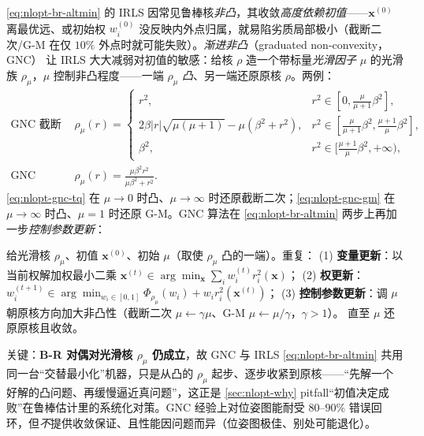 \cref{eq:nlopt-br-altmin} 的 IRLS 因常见鲁棒核\emph{非凸}，其收敛\emph{高度依赖初值}——$\mathbf{x}^{(0)}$ 离最优远、或初始权 $w_i^{(0)}$ 没反映内外点归属，就易陷劣质局部极小（截断二次/G-M 在仅 $10\%$ 外点时就可能失败\cite{carlone2026handbook}）。\emph{渐进非凸}（graduated non-convexity，GNC）\cite{yang2020gnc} 让 IRLS 大大减弱对初值的敏感：给核 $\rho$ 造一个带标量\emph{光滑因子} $\mu$ 的光滑族 $\rho_\mu$，$\mu$ 控制非凸程度——一端 $\rho_\mu$ \emph{凸}、另一端还原原核 $\rho$。两例：
\begin{align}
  \text{GNC 截断二次：}\ &\rho_\mu(r)=
  \begin{cases}
  r^2,& r^2\in[0,\tfrac{\mu}{\mu+1}\beta^2],\\
  2\beta|r|\sqrt{\mu(\mu+1)}-\mu(\beta^2+r^2),& r^2\in[\tfrac{\mu}{\mu+1}\beta^2,\tfrac{\mu+1}{\mu}\beta^2],\\
  \beta^2,& r^2\in[\tfrac{\mu+1}{\mu}\beta^2,+\infty),
  \end{cases}
  \label{eq:nlopt-gnc-tq}\\
  \text{GNC Geman--McClure：}\ &\rho_\mu(r)=\frac{\mu\beta^2 r^2}{\mu\beta^2+r^2}.
  \label{eq:nlopt-gnc-gm}
\end{align}
\cref{eq:nlopt-gnc-tq} 在 $\mu\to0$ 时凸、$\mu\to\infty$ 时还原截断二次；\cref{eq:nlopt-gnc-gm} 在 $\mu\to\infty$ 时凸、$\mu{=}1$ 时还原 G-M。GNC 算法在 \cref{eq:nlopt-br-altmin} 两步上再加一步\emph{控制参数更新}：
\begin{algo}\label{alg:nlopt-gnc}
给光滑核 $\rho_\mu$、初值 $\mathbf{x}^{(0)}$、初始 $\mu$（取使 $\rho_\mu$ 凸的一端）。重复：
(1) \textbf{变量更新}：以当前权解加权最小二乘 $\mathbf{x}^{(t)}\in\arg\min_{\mathbf{x}}\sum_i w_i^{(t)}r_i^2(\mathbf{x})$；
(2) \textbf{权更新}：$w_i^{(t+1)}\in\arg\min_{w_i\in[0,1]}\Phi_{\rho_\mu}(w_i)+w_i r_i^2(\mathbf{x}^{(t)})$；
(3) \textbf{控制参数更新}：调 $\mu$ 朝原核方向加大非凸性（截断二次 $\mu\leftarrow\gamma\mu$、G-M $\mu\leftarrow\mu/\gamma$，$\gamma>1$）。
直至 $\mu$ 还原原核且收敛。
\end{algo}
\noindent 关键：\textbf{B-R 对偶对光滑核 $\rho_\mu$ 仍成立}，故 GNC 与 IRLS \cref{eq:nlopt-br-altmin} 共用同一台“交替最小化”机器，只是从凸的 $\rho_\mu$ 起步、逐步收紧到原核——“先解一个好解的凸问题、再缓慢逼近真问题”，这正是 \cref{sec:nlopt-why} pitfall“初值决定成败”在鲁棒估计里的系统化对策。GNC 经验上对位姿图能耐受 $80\text{--}90\%$ 错误回环，但\emph{不}提供收敛保证、且性能因问题而异（位姿图极佳、别处可能退化）。

